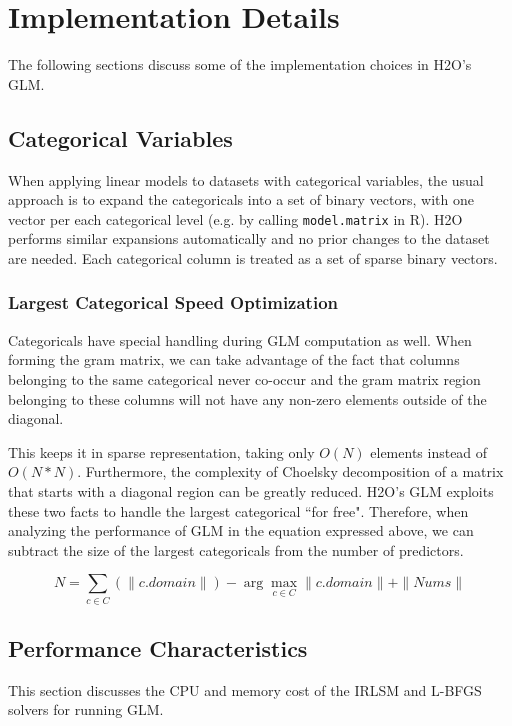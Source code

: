 \section{Implementation Details}

The following sections discuss some of the implementation choices in H2O's GLM.

\subsection{Categorical Variables}

When applying linear models to datasets with categorical variables, the usual approach is to expand the
categoricals into a set of binary vectors, with one vector per each categorical level (e.g. by calling
{\texttt{model.matrix}} in R). H2O performs similar expansions automatically and no prior changes to the dataset
are needed. Each categorical column is treated as a set of sparse binary vectors.

\subsubsection{Largest Categorical Speed Optimization}

Categoricals have special handling during GLM computation as well. When forming the gram matrix, we can take
advantage of the fact that columns belonging to the same categorical never co-occur and the gram matrix region
belonging to these columns will not have any non-zero elements outside of the diagonal. 

This keeps it in sparse representation, taking only $O(N)$ elements instead of $O(N*N)$. Furthermore, the complexity of Choelsky
decomposition of a matrix that starts with a diagonal region can be greatly reduced. H2O's GLM exploits these two
facts to handle the largest categorical ``for free". Therefore, when analyzing the performance of GLM in the
equation expressed above, we can subtract the size of the largest categoricals from the number of predictors.

$$N = \sum_{c \in C} (\|c.domain\|) - \arg\max_{c \in C} \|c.domain\| + \|Nums\| $$

\subsection{Performance Characteristics}

This section discusses the CPU and memory cost of the IRLSM and L-BFGS solvers for running GLM.

